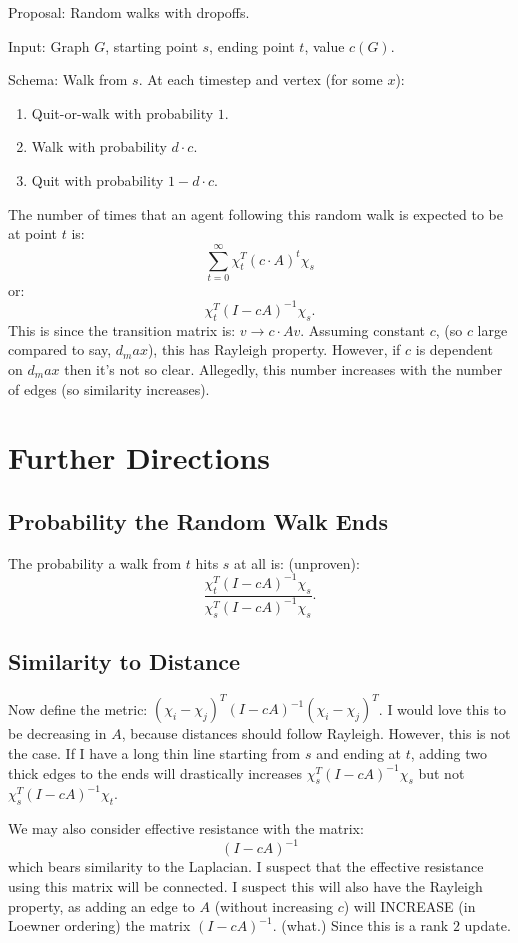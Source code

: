 \noindent Proposal: Random walks with dropoffs.

\noindent Input: Graph $G$, starting point $s$, ending point $t$,
  value $c(G)$.

\noindent Schema: Walk from $s$. At each timestep and vertex (for some $x$):
\begin{enumerate}
\item Quit-or-walk with probability $1$.
\item Walk with probability $d\cdot c$.
\item Quit with probability $1-d\cdot c$.
\end{enumerate}
The number of times that an agent following this random walk is
expected to be at point $t$ is:
\[ \sum_{t = 0}^\infty \chi_t^T(c \cdot A)^t \chi_s \]
or:
\[ \chi_t^T (I - cA)^{-1} \chi_s. \]
This is since the transition matrix is:
$v \rightarrow c \cdot Av$.
Assuming constant $c$, (so $c$ large compared to say, $d_max$), this
has Rayleigh property. However, if $c$ is dependent on $d_max$
then it's not so clear. Allegedly, this number increases with the
number of edges (so similarity increases).

\section{Further Directions}
\subsection{Probability the Random Walk Ends}
The probability a walk from $t$ hits $s$ at all is: (unproven):
\[ \frac{\chi_t^T (I - cA)^{-1} \chi_s}
{\chi_s^T (I - cA)^{-1} \chi_s}. \]
\subsection{Similarity to Distance}
Now define the metric: 
$(\chi_i - \chi_j)^T (I-cA)^{-1} (\chi_i - \chi_j)^T$. I would
love this to be decreasing in $A$, because distances should
follow Rayleigh. However, this is not the case. If I have a long
thin line starting from $s$ and ending at $t$, adding two thick
edges to the ends will drastically increases $\chi_s^T (I - cA)^{-1}
\chi_s$ but not $\chi_s^T (I-cA)^{-1} \chi_t$.

We may also consider effective resistance with the matrix:
\[ (I - cA)^{-1} \]
which bears similarity to the Laplacian. I suspect that the
effective resistance using this matrix will be connected. I
suspect this will also have the Rayleigh property, as adding an
edge to $A$ (without increasing $c$) will INCREASE (in Loewner
ordering) the matrix $(I -cA)^{-1}$. (what.) Since this is a rank
$2$ update.

